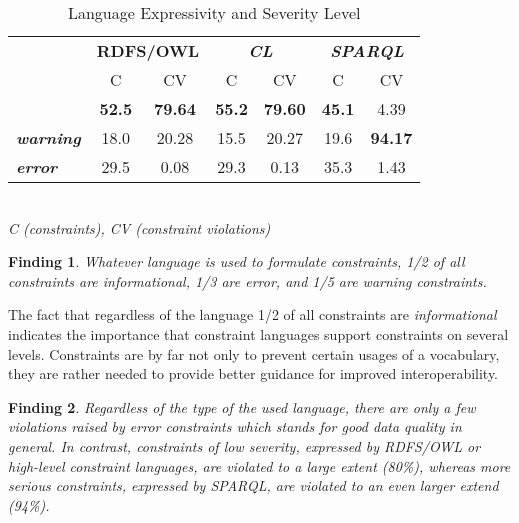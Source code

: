 \documentclass[conference]{IEEEtran}
\newtheorem{hyp}{Finding}
\begin{document}
\begin{table}[H]
		\scriptsize
    \begin{center}
		\caption{Language Expressivity and Severity Level}
		\label{tab:evaluation-expressivity-severity}
    \begin{tabular}{@{}lcc|cc|cc@{}}
    \multirow{3}{*}{} &
      \multicolumn{2}{c}{\textbf{RDFS/OWL}} &
      \multicolumn{2}{c}{\textbf{\emph{CL}}} &
      \multicolumn{2}{c}{\textbf{\emph{SPARQL}}} \\
    \textbf{} & C & CV & C & CV & C & CV \\
    \hline
		\textbf{\emph{info}} & \textbf{52.5} & \textbf{79.64} & \textbf{55.2} & \textbf{79.60} & \textbf{45.1} & 4.39 \\
		\textbf{\emph{warning}} & 18.0 & 20.28 & 15.5 & 20.27 & 19.6 & \textbf{94.17} \\
		\textbf{\emph{error}} & 29.5 & 0.08 & 29.3 & 0.13 & 35.3 & 1.43 \\
    \bottomrule
    \end{tabular}
		\\ \emph{C (constraints), CV (constraint violations)}
    \end{center}
\end{table}

\begin{hyp}
Whatever language is used to formulate constraints, 1/2 of all constraints are informational, 1/3 are error, and 1/5 are warning constraints. 
\end{hyp}

The fact that regardless of the language 1/2 of all constraints are \emph{informational} 
indicates the importance that constraint languages support
constraints on several levels. Constraints are by far not only to
prevent certain usages of a vocabulary, they are rather needed to
provide better guidance for improved interoperability.

\begin{hyp}
Regardless of the type of the used language, there are only a few violations raised by \emph{error} constraints which stands for good data quality in general.
In contrast, constraints of low severity, expressed by RDFS/OWL or high-level constraint languages, are violated to a large extent (80\%), whereas more serious constraints, expressed by SPARQL, are violated to an even larger extend (94\%).
\end{hyp}
\end{document}
